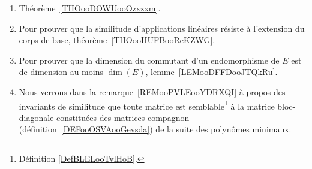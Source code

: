 
\begin{enumerate}
	\item
	      Théorème~\ref{THOooDOWUooOzxzxm}.
	\item
	      Pour prouver que la similitude d'applications linéaires résiste à l'extension du corps de base, théorème~\ref{THOooHUFBooReKZWG}.
	\item
	      Pour prouver que la dimension du commutant d'un endomorphisme de \( E\) est de dimension au moins \( \dim(E)\), lemme~\ref{LEMooDFFDooJTQkRu}.
	\item
        Nous verrons dans la remarque~\ref{REMooPVLEooYDRXQI} à propos des invariants de similitude que toute matrice est semblable\footnote{Définition \ref{DefBLELooTvlHoB}.} à la matrice bloc-diagonale constituées des matrices compagnon (définition~\ref{DEFooOSVAooGevsda}) de la suite des polynômes minimaux.
\end{enumerate}
